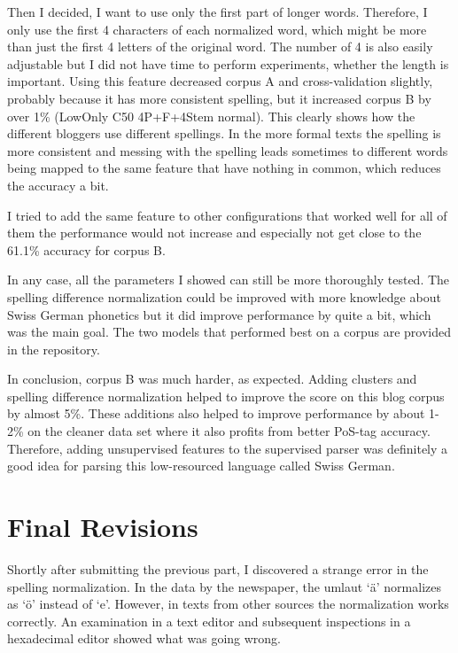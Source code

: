 \documentclass[11pt,letterpaper, covington]{article}
\begin{document}
Then I decided, I want to use only the first part of longer words. Therefore, I only use the first 4 characters of each normalized word, which might be more than just the first 4 letters of the original word. The number of 4 is also easily adjustable but I did not have time to perform experiments, whether the length is important. Using this feature decreased corpus A and cross-validation slightly, probably because it has more consistent spelling, but it increased corpus B by over 1\% (LowOnly C50 4P+F+4Stem normal). This clearly shows how the different bloggers use different spellings. In the more formal texts the spelling is more consistent and messing with the spelling leads sometimes to different words being mapped to the same feature that have nothing in common, which reduces the accuracy a bit.

I tried to add the same feature to other configurations that worked well for all of them the performance would not increase and especially not get close to the 61.1\% accuracy for corpus B.

In any case, all the parameters I showed can still be more thoroughly tested. The spelling difference normalization could be improved with more knowledge about Swiss German phonetics but it did improve performance by quite a bit, which was the main goal. The two models that performed best on a corpus are provided in the repository.


In conclusion, corpus B was much harder, as expected. Adding clusters and spelling difference normalization helped to improve the score on this blog corpus by almost 5\%. These additions also helped to improve performance by about 1-2\% on the cleaner data set where it also profits from better PoS-tag accuracy. Therefore, adding unsupervised features to the supervised parser was definitely a good idea for parsing this low-resourced language called Swiss German.

\section{Final Revisions}

Shortly after submitting the previous part, I discovered a strange error in the spelling normalization. In the data by the newspaper, the umlaut `ä' normalizes as `ö' instead of `e'. However, in texts from other sources the normalization works correctly. An examination in a text editor and subsequent inspections in a hexadecimal editor showed what was going wrong.
\end{document}

